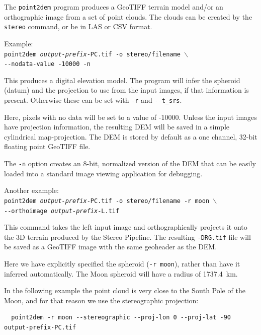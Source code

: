 The \texttt{point2dem} program produces a GeoTIFF terrain model and/or
an orthographic image from a set of point clouds. The clouds can be
created by the {\tt stereo} command, or be in LAS or CSV format.

Example:\\
\hspace*{2em}\texttt{point2dem \textit{output-prefix}-PC.tif -o stereo/filename $\backslash$} \\
\hspace*{4em}\texttt{-\/-nodata-value -10000 -n}

This produces a digital elevation model. The program will infer the
spheroid (datum) and the projection to use from the input images, if that
information is present. Otherwise these can be set with \texttt{-r} and \texttt{-\/-t\_srs}.

Here, pixels with no data will be set to a value of -10000. Unless the input
images have projection information, the resulting \ac{DEM} will be saved
in a simple cylindrical map-projection.  The \ac{DEM} is
stored by default as a one channel, 32-bit floating point GeoTIFF file.

The {\tt -n} option creates an 8-bit, normalized version of the DEM
that can be easily loaded into a standard image viewing application
for debugging.

Another example: \\
\hspace*{2em}\texttt{point2dem \textit{output-prefix}-PC.tif -o stereo/filename -r moon $\backslash$} \\
\hspace*{4em}\texttt{-\/-orthoimage \textit{output-prefix}-L.tif}

This command takes the left input image and orthographically projects
it onto the 3D terrain produced by the Stereo Pipeline.  The resulting
{\tt *-DRG.tif} file will be saved as a GeoTIFF image with the same
geoheader as the DEM.

Here we have explicitly specified the spheroid (\texttt{-r moon}), rather
than have it inferred automatically. The Moon spheroid will have
a radius of 1737.4~km.

In the following example the point cloud is very close to the
South Pole of the Moon, and for that reason we use the stereographic projection:
\begin{verbatim}
  point2dem -r moon --stereographic --proj-lon 0 --proj-lat -90 output-prefix-PC.tif
\end{verbatim}

